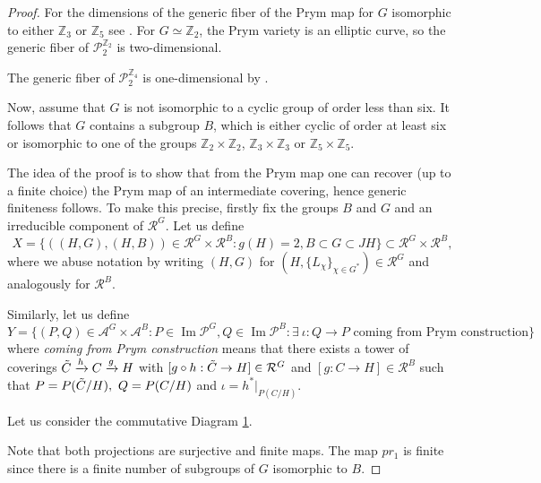 \documentclass{amsart}
\theoremstyle{remark}
\numberwithin{equation}{section}
\newcommand{\tC}{\Tilde{C}}
\DeclareMathOperator{\im}{Im}
\begin{document}
\begin{proof}
    For the dimensions of the generic fiber of the Prym map for \(G\) isomorphic to either \(\mathbb{Z}_3\) or \(\mathbb{Z}_5\) see \cite{Xiao}. For \(G \simeq \mathbb{Z}_2\), the Prym variety is an elliptic curve, so the generic fiber of $\mathcal{P}_2^{\mathbb{Z}_2}$ is two-dimensional.
    
The generic fiber of $\mathcal{P}_2^{\mathbb{Z}_4}$ is one-dimensional by \cite{anatoli}. 


    Now, assume that $G$ is not isomorphic to a cyclic group of order less than six. It follows that $G$ contains a subgroup $B$, which is either cyclic of order at least six or isomorphic to one of the groups $\mathbb{Z}_2 \times \mathbb{Z}_2$, $\mathbb{Z}_3 \times \mathbb{Z}_3$ or $\mathbb{Z}_5 \times \mathbb{Z}_5$. 

The idea of the proof is to show that from the Prym map one can recover (up to a finite choice) the Prym map of an intermediate covering, hence generic finiteness follows.
To make this precise, firstly fix the groups $B$ and $G$ and an irreducible component of $\mathcal{R}^G$. Let us define
$$X = \{((H,G), (H,B)) \in \mathcal{R}^G\times\mathcal{R}^B: g(H) = 2, B \subset G \subset JH\}\subset \mathcal{R}^G\times\mathcal{R}^B,$$ 
where we abuse notation by writing $(H,G)$ for $(H, \{L_{\chi}\}_{\chi \in G^*}) \in \mathcal{R}^G$ and analogously for $\mathcal{R}^B$.

Similarly, let us define
$$Y=\{(P,Q)\in \mathcal{A}^G\times\mathcal{A}^B: P\in\im\mathcal{P}^G, Q\in\im\mathcal{P}^B: \exists \: \iota: Q \to P \text{ coming from Prym construction}\}%
$$
where \textit{coming from Prym construction} means that there exists a tower of coverings $\tC\xrightarrow{h}C\xrightarrow{g} H$ with $[g\circ h: \tC \to H] \in \mathcal{R}^G$ and $[g: C \to H] \in \mathcal{R}^B$ such that $P=P(\tC/H),\ Q=P(C/H)$ and $\iota=h^*|_{P(C/H)}$.



Let us consider the commutative Diagram \ref{diagram4}.
    \begin{figure}
\caption{}
\label{diagram4}
\end{figure}
Note that both projections are surjective and finite maps. The map $pr_1$ is finite since there is a finite number of subgroups of $G$ isomorphic to $B$.


\end{proof}
\end{document}
